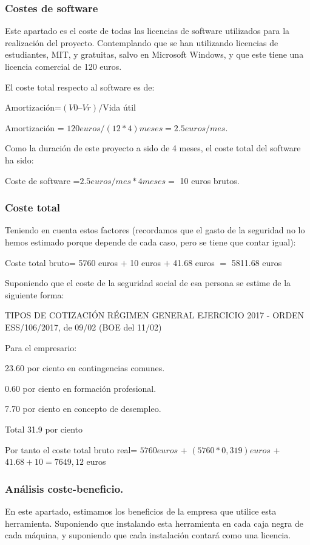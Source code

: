 \subsubsection{Costes de software}
Este apartado es el coste de todas las licencias de software utilizados para la realización del proyecto. Contemplando que se han utilizando licencias de estudiantes, MIT, y gratuitas, salvo en Microsoft Windows, y que este tiene una licencia comercial de 120 euros. 

El coste total respecto al software es de:

Amortización=$(V0–Vr)/$Vida útil

Amortización = $120 euros / (12*4) meses = 2.5 euros / mes.$

Como la duración de este proyecto a sido de 4 meses, el coste total del software ha sido:

Coste de software =$ 2.5 euros / mes * 4 meses=$ 10  euros brutos.
\subsubsection{Coste total}
Teniendo en cuenta estos factores (recordamos que el gasto de la seguridad no lo hemos estimado porque depende de cada caso, pero se tiene que contar igual):

Coste total bruto=  5760 euros $+$ 10 euros $+$ 41.68 euros $=$ 5811.68 euros

Suponiendo que el coste de la seguridad social de esa persona se estime de la siguiente forma:

TIPOS DE COTIZACIÓN RÉGIMEN GENERAL EJERCICIO 2017 - ORDEN ESS/106/2017, de 09/02 (BOE del 11/02)
 
Para el empresario:

23.60 por ciento en contingencias comunes.

0.60 por ciento en formación profesional.
 
7.70 por ciento en concepto de desempleo.

Total  31.9 por ciento

Por tanto el coste total bruto real= $5760 euros$ + $(5760*0,319) euros$ + $41.68+ 10 = 7649,12$ euros


\subsubsection{Análisis coste-beneficio.}

En este apartado, estimamos los beneficios de la empresa que utilice esta herramienta. Suponiendo que instalando esta  herramienta en cada caja negra de cada máquina, y  suponiendo que cada instalación contará como una licencia. 

